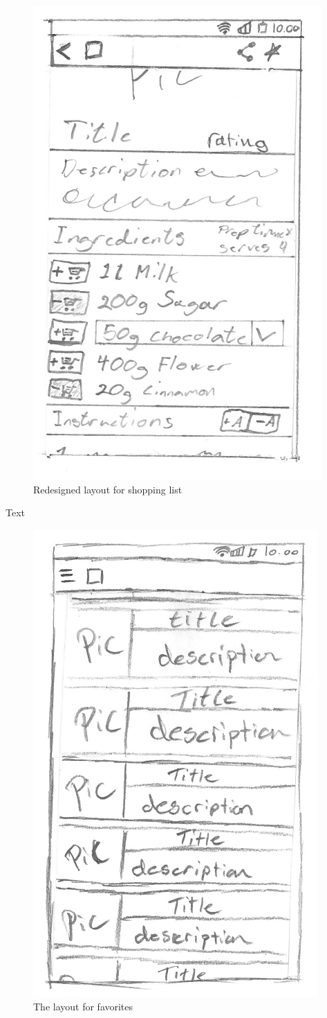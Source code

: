 \begin{figure}[H]
\begin{minipage}[b]{0.5\columnwidth}
\includegraphics[width=0.7\columnwidth]{img/prototypes/recipe_new.pdf}
\caption{Redesigned layout for shopping list\label{fig:shoppingnew}}
\end{minipage}
\end{figure}

Text

\begin{figure}[H]
\begin{minipage}[b]{0.5\columnwidth}
\centering
\includegraphics[width=0.7\columnwidth]{img/prototypes/favorites.pdf}
\caption{The layout for favorites\label{fig:recipeold}}
\end{minipage}
\end{figure}